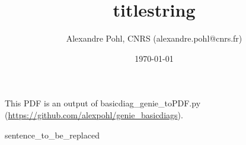 \documentclass[a4paper,12pt]{scrartcl}
\begin{document}
\title{titlestring}
\author{Alexandre Pohl, CNRS (alexandre.pohl@cnrs.fr)}
\date{\today}
\maketitle

\listoffigures

\clearpage

This PDF is an output of basicdiag_genie_toPDF.py (\url{https://github.com/alexpohl/genie_basicdiags}). \\


\begin{flushleft}
sentence_to_be_replaced
\end{flushleft}

\clearpage

\end{document}
